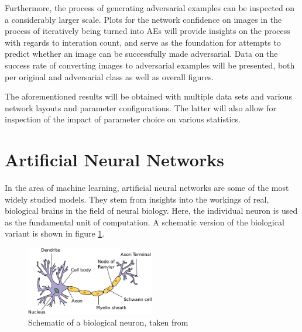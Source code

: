 \documentclass[11pt, a4paper]{article}
\begin{document}
Furthermore, the process of generating adversarial examples can be inspected on a considerably larger scale. Plots for the network confidence on images in the process of iteratively being turned into AEs will provide insights on the process with regards to interation count, and serve as the foundation for attempts to predict whether an image can be successfully made adversarial. Data on the success rate of converting images to adversarial examples will be presented, both per original and adversarial class as well as overall figures.

The aforementioned results will be obtained with multiple data sets and various network layouts and parameter configurations. The latter will also allow for inspection of the impact of parameter choice on various statistics.











\newpage
\section{Artificial Neural Networks}
\label{sec:artificial-neural-networks}
In the area of machine learning, artificial neural networks are some of the most widely studied models. They stem from insights into the workings of real, biological brains in the field of neural biology. Here, the individual neuron is used as the fundamental unit of computation. A schematic version of the biological variant is shown in figure \ref{fig:biological-neuron-schematic}.

\begin{figure}[htp]
	\centering
	\includegraphics[width=0.5\textwidth]{images/biological_neuron.png}
	\caption{Schematic of a biological neuron, taken from \cite{biological-neuron-schematic}}
	\label{fig:biological-neuron-schematic}
\end{figure}
\end{document}
